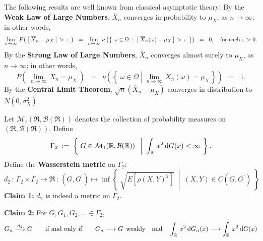 \begin{remark}\quad
The following results are well known from classical asymptotic theory:
\vskip 0.1cm
\noindent
By the \textbf{Weak Law of Large Numbers}, $\overline{X}_{n}$ converges in probability to $\mu_{X}$,
as $n \longrightarrow \infty$; in other words,
\begin{equation*}
\lim_{n\rightarrow\infty}\,P\!\left(\;\left\vert\,\overline{X}_{n} - \mu_{X}\,\right\vert \,>\, \varepsilon\;\right)
\;\;=\;\;
\lim_{n\rightarrow\infty}\,\nu\left(\left\{\;\omega\in\Omega\;:\;\left\vert\,\overline{X}_{n}(\omega) - \mu_{X}\,\right\vert \,>\, \varepsilon\;\right\}\right)
\;\;=\;\; 0,
\quad\textnormal{for each $\varepsilon > 0$}.
\end{equation*}
By the \textbf{Strong Law of Large Numbers}, $\overline{X}_{n}$ converges almost surely to $\mu_{X}$,
as $n \longrightarrow \infty$; in other words,
\begin{equation*}
P\!\left(\;\lim_{n\rightarrow\infty}\,\overline{X}_{n} = \mu_{X}\;\right)
\;\;=\;\;
\nu\left(\left\{\;\omega\in\Omega \;\left\vert\; \lim_{n\rightarrow\infty}\,\overline{X}_{n}(\omega) = \mu_{X} \right. \,\right\}\right)
\;\;=\;\; 1.
\end{equation*}
By the \textbf{Central Limit Theorem}, $\sqrt{n}\left(\overline{X}_{n} - \mu_{X}\right)$ converges in distribution to $N(0,\sigma^{2}_{X})$.
\end{remark}

\proof
Let $\mathcal{M}_{1}(\Re,\mathcal{B}(\Re))$ denotes the collection
of probability measures on $(\Re,\mathcal{B}(\Re))$.
Define
\begin{equation*}
\Gamma_{2}
\; := \;
\left\{\;
G \in \mathcal{M}_{1}(\mathbb{R},\mathcal{B}(\mathbb{R}))
\;\;\left\vert\;\;
\int_{\mathbb{R}}\,x^{2}\,\textnormal{d} G(x) < \infty
\right.
\;\right\}.
\end{equation*}
Define the \textbf{Wasserstein metric} on $\Gamma_{2}$:
\begin{equation*}
d_{2}
\,:\, \Gamma_{2} \times \Gamma_{2} \longrightarrow \Re
\,:\, (G,G^{\prime}) \longmapsto
\inf\left\{\;
\left.
\sqrt{E\!\left[\rho(X,Y)^{2}\right]}
\;\;\right\vert\;\;
(X,Y)\in C(G,G^{\prime})
\;\right\}
\end{equation*}
\mbox{}
\vskip 0.5cm
\noindent
\textbf{Claim 1:}\; $d_{2}$ is indeed a metric on $\Gamma_{2}$.

\mbox{}
\vskip 0.5cm
\noindent
\textbf{Claim 2:}\; For $G, G_{1}, G_{2}, \ldots \in \Gamma_{2}$,
\begin{equation*}
G_{n} \overset{d_{2}}{\longrightarrow} G
\quad\quad\textnormal{if and only if}\quad\quad
G_{n}\longrightarrow G\;\,\textnormal{weakly}
\quad\textnormal{and}\quad
\int_{\mathbb{R}}\,x^{2}\,\textnormal{d} G_{n}(x) \longrightarrow \int_{\mathbb{R}}\,x^{2}\,\textnormal{d} G(x)
\end{equation*}

